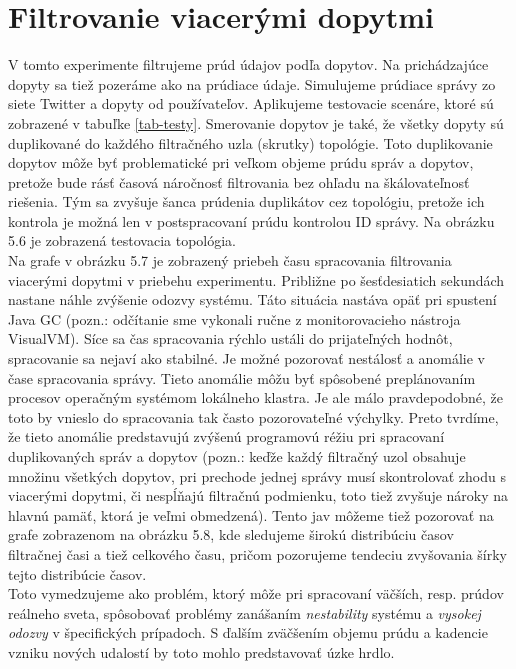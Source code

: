 \section{Filtrovanie viacerými dopytmi}
V tomto experimente filtrujeme prúd údajov podľa dopytov. Na prichádzajúce dopyty sa tiež pozeráme ako na prúdiace údaje. Simulujeme prúdiace správy zo siete Twitter a dopyty od používateľov. Aplikujeme testovacie scenáre, ktoré sú zobrazené v tabuľke \ref{tab-testy}. Smerovanie dopytov je také, že všetky dopyty sú duplikované do každého filtračného uzla (skrutky) topológie. Toto duplikovanie dopytov môže byť problematické pri veľkom objeme prúdu správ a dopytov, pretože bude rásť časová náročnosť filtrovania bez ohľadu na škálovateľnosť riešenia. Tým sa zvyšuje šanca prúdenia duplikátov cez topológiu, pretože ich kontrola je možná len v postspracovaní prúdu kontrolou ID správy. Na obrázku 5.6 je zobrazená testovacia topológia.
\\[5pt]
Na grafe v obrázku 5.7 je zobrazený priebeh času spracovania filtrovania viacerými dopytmi v priebehu experimentu. Približne po šesťdesiatich sekundách nastane náhle zvýšenie odozvy systému. Táto situácia nastáva opäť pri spustení Java GC (pozn.: odčítanie sme vykonali ručne z monitorovacieho nástroja VisualVM). Síce sa čas spracovania rýchlo ustáli do prijateľných hodnôt, spracovanie sa nejaví ako stabilné. Je možné pozorovať nestálosť a anomálie v čase spracovania správy. Tieto anomálie môžu byť spôsobené preplánovaním procesov operačným systémom lokálneho klastra. Je ale málo pravdepodobné, že toto by vnieslo do spracovania tak často pozorovateľné výchylky. Preto tvrdíme, že tieto anomálie predstavujú zvýšenú programovú réžiu pri spracovaní duplikovaných správ a dopytov (pozn.: keďže každý filtračný uzol obsahuje množinu všetkých dopytov, pri prechode jednej správy musí skontrolovať zhodu s viacerými dopytmi, či nespĺňajú filtračnú podmienku, toto tiež zvyšuje nároky na hlavnú pamäť, ktorá je veľmi obmedzená). Tento jav môžeme tiež pozorovať na grafe zobrazenom na obrázku 5.8, kde sledujeme širokú distribúciu časov filtračnej časi a tiež celkového času, pričom pozorujeme tendeciu zvyšovania šírky tejto distribúcie časov. 
\\[5pt]
Toto vymedzujeme ako problém, ktorý môže pri spracovaní väčších, resp. prúdov reálneho sveta, spôsobovať problémy zanášaním \textit{nestability} systému a \textit{vysokej odozvy} v špecifických prípadoch. S ďalším zväčšením objemu prúdu a kadencie vzniku nových udalostí by toto mohlo predstavovať úzke hrdlo. 
\\[5pt]
